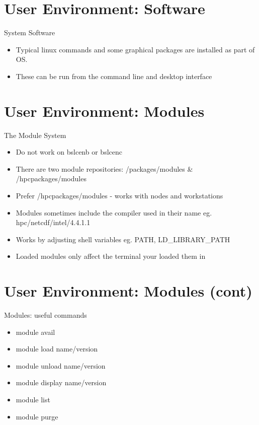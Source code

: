 {
\section{User Environment: Software}
%
\begin{frame}{System Software}
\begin{itemize}
\item Typical linux commands and some graphical packages are installed as part of OS.
\item These can be run from the command line and desktop interface
\end{itemize}
\end{frame}
}

{
\section{User Environment: Modules}
%
\begin{frame}{The Module System}
\begin{itemize}
\item Do not work on bslcenb or bslcenc
\item There are two module repositories: /packages/modules & /hpcpackages/modules
\item Prefer /hpcpackages/modules - works with nodes and workstations
\item Modules sometimes include the compiler used in their name eg. hpc/netcdf/intel/4.4.1.1
\item Works by adjusting shell variables eg. PATH, LD_LIBRARY_PATH
\item Loaded modules only affect the terminal your loaded them in
\end{itemize}
\end{frame}
}

{
\section{User Environment: Modules (cont)}
%
\begin{frame}{Modules: useful commands}
\begin{multicols}{2}
\begin{itemize}
\item module avail 
\item module load name/version 
\item module unload name/version 

\columnbreak

\item module display name/version
\item module list
\item module purge
\end{itemize}
\end{multicols}
\end{frame}
}

